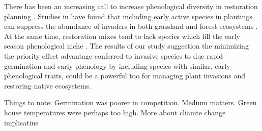 \documentclass{article}\usepackage[]{graphicx}\usepackage[]{color}
\begin{document}
There has been an increasing call to increase phenological diversity in restoration planning \citep{Hess:2019vn}. Studies in  have found that including early active species in plantings can suppress the abundance of invaders in both grassland \citep{Cleland:2013wo} and forest ecosystems \citep{Schuster:2020ww}. At the same time, restoration mixes tend to lack species which fill the early season phenological niche \citep{Havens:2016vo}. The results of our study suggestion the minimizing the priority effect advantage conferred to invasive species to due rapid germination and early phenology by including species with similar, early phenological traits, could be a powerful too for managing plant invasions and restoring native ecosystems.


Things to note: Germination was poorer in competition. Medium matters. Green house temperatures were perhaps too high.
More about cliamte change implicatins

\end{document}
